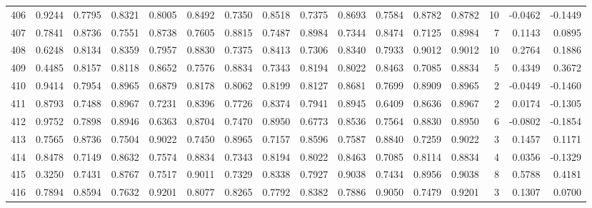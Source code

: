 \begin{tabular}{lrrrrrrrrrrrrrrr}
406 &      0.9244 &  0.7795 &  0.8321 &  0.8005 &  0.8492 &  0.7350 &  0.8518 &  0.7375 &  0.8693 &  0.7584 &   0.8782 &     0.8782 &     10 &                   -0.0462 &                    -0.1449 \\
407 &      0.7841 &  0.8736 &  0.7551 &  0.8738 &  0.7605 &  0.8815 &  0.7487 &  0.8984 &  0.7344 &  0.8474 &   0.7125 &     0.8984 &      7 &                    0.1143 &                     0.0895 \\
408 &      0.6248 &  0.8134 &  0.8359 &  0.7957 &  0.8830 &  0.7375 &  0.8413 &  0.7306 &  0.8340 &  0.7933 &   0.9012 &     0.9012 &     10 &                    0.2764 &                     0.1886 \\
409 &      0.4485 &  0.8157 &  0.8118 &  0.8652 &  0.7576 &  0.8834 &  0.7343 &  0.8194 &  0.8022 &  0.8463 &   0.7085 &     0.8834 &      5 &                    0.4349 &                     0.3672 \\
410 &      0.9414 &  0.7954 &  0.8965 &  0.6879 &  0.8178 &  0.8062 &  0.8199 &  0.8127 &  0.8681 &  0.7699 &   0.8909 &     0.8965 &      2 &                   -0.0449 &                    -0.1460 \\
411 &      0.8793 &  0.7488 &  0.8967 &  0.7231 &  0.8396 &  0.7726 &  0.8374 &  0.7941 &  0.8945 &  0.6409 &   0.8636 &     0.8967 &      2 &                    0.0174 &                    -0.1305 \\
412 &      0.9752 &  0.7898 &  0.8946 &  0.6363 &  0.8704 &  0.7470 &  0.8950 &  0.6773 &  0.8536 &  0.7564 &   0.8830 &     0.8950 &      6 &                   -0.0802 &                    -0.1854 \\
413 &      0.7565 &  0.8736 &  0.7504 &  0.9022 &  0.7450 &  0.8965 &  0.7157 &  0.8596 &  0.7587 &  0.8840 &   0.7259 &     0.9022 &      3 &                    0.1457 &                     0.1171 \\
414 &      0.8478 &  0.7149 &  0.8632 &  0.7574 &  0.8834 &  0.7343 &  0.8194 &  0.8022 &  0.8463 &  0.7085 &   0.8114 &     0.8834 &      4 &                    0.0356 &                    -0.1329 \\
415 &      0.3250 &  0.7431 &  0.8767 &  0.7517 &  0.9011 &  0.7329 &  0.8338 &  0.7927 &  0.9038 &  0.7434 &   0.8956 &     0.9038 &      8 &                    0.5788 &                     0.4181 \\
416 &      0.7894 &  0.8594 &  0.7632 &  0.9201 &  0.8077 &  0.8265 &  0.7792 &  0.8382 &  0.7886 &  0.9050 &   0.7479 &     0.9201 &      3 &                    0.1307 &                     0.0700 \\

\end{tabular}

